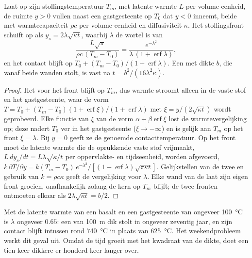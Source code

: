 \begin{proposition}\label{prop:b2:magma-emplacement:stefan}
Laat  op zijn stollingstemperatuur $T_m$, met latente warmte $L$ per volume-eenheid,
de ruimte $y > 0$ vullen naast een gastgesteente op $T_0$ dat $y < 0$ inneemt, beide
met warmtecapaciteit $\rho c$ per volume-eenheid en diffusiviteit $\kappa$. Het
stollingsfront schuift op als $y_s = 2\lambda\sqrt{\kappa t}$, waarbij $\lambda$
de wortel is van
\[
\frac{L\sqrt\pi}{\rho c\,(T_m - T_0)} = \frac{e^{-\lambda^2}}{\lambda\,(1 + \operatorname{erf}\lambda)},
\]
en het contact blijft op $T_0 + (T_m - T_0)/(1 + \operatorname{erf}\lambda)$. Een 
met dikte $b$, die vanaf beide wanden stolt, is vast na
$t = b^2/(16\lambda^2\kappa)$.
\end{proposition}

\begin{proof}
Het  voor het front blijft op $T_m$, dus warmte stroomt alleen in de vaste stof
en het gastgesteente, waar de vorm $T = T_0 + (T_m - T_0)(1 + \operatorname{erf}\xi)/(1 +
\operatorname{erf}\lambda)$ met $\xi = y/(2\sqrt{\kappa t})$ wordt geprobeerd. Elke functie van $\xi$
van de vorm $\alpha + \beta\operatorname{erf}\xi$ lost de warmtevergelijking op; deze
nadert $T_0$ ver in het gastgesteente ($\xi \to -\infty$) en is gelijk aan $T_m$ op het front
$\xi = \lambda$. Bij $y = 0$ geeft ze de genoemde contacttemperatuur. Op het front
moet de latente warmte die de oprukkende vaste stof vrijmaakt, $L\,dy_s/dt = L\lambda\sqrt{\kappa/t}$
per oppervlakte- en tijdseenheid, worden afgevoerd, $k\,\partial T/\partial y = k(T_m -
T_0)\,e^{-\lambda^2}/[(1 + \operatorname{erf}\lambda)\sqrt{\pi\kappa t}]$. Gelijkstellen van de
twee en gebruik van $k = \rho c\kappa$ geeft de vergelijking voor $\lambda$. Elke wand van de
 laat zijn eigen front groeien, onafhankelijk zolang de kern op $T_m$ blijft; de twee
fronten ontmoeten elkaar als $2\lambda\sqrt{\kappa t} = b/2$.
\end{proof}

Met de latente warmte van een basalt en een gastgesteente van ongeveer \qty{100}{\celsius}
is $\lambda$ ongeveer $0.65$: een  van \qty{100}{m} dik stolt in ongeveer
zeventig jaar, en zijn contact blijft intussen rond \qty{740}{\celsius} in plaats van
\qty{625}{\celsius}. Het weekendprobleem werkt dit geval uit.
Omdat de tijd groeit met het kwadraat van de dikte, doet een tien keer dikkere 
er honderd keer langer over.

